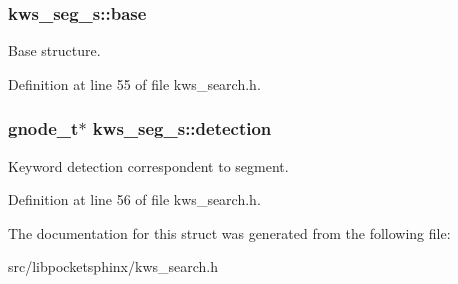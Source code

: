 \subsubsection[{base}]{ kws\-\_\-seg\-\_\-s\-::base}\label{structkws__seg__s_ab8b059f475f5e64301195cf9816bde2a}


Base structure. 



Definition at line 55 of file kws\-\_\-search.\-h.

\subsubsection[{detection}]{\setlength{\rightskip}{0pt plus 5cm}gnode\-\_\-t$\ast$ kws\-\_\-seg\-\_\-s\-::detection}\label{structkws__seg__s_a5de99d98b2be6e0348033c9fc05ec139}


Keyword detection correspondent to segment. 



Definition at line 56 of file kws\-\_\-search.\-h.



The documentation for this struct was generated from the following file\-:\begin{DoxyCompactItemize}
\item 
src/libpocketsphinx/kws\-\_\-search.\-h\end{DoxyCompactItemize}
